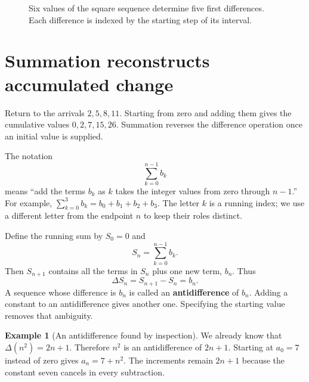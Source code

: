 \documentclass[11pt,oneside,openany]{book}
\theoremstyle{definition}
\newtheorem{example}{Example}[chapter]
\theoremstyle{remark}
\numberwithin{equation}{chapter}
\begin{document}
\begin{figure}[htbp]\centering
{}
\caption{Six values of the square sequence determine five first differences. Each difference is indexed by the starting step of its interval.}\end{figure}

\section{Summation reconstructs accumulated change}\label{ch01-summation-reconstructs-accumulated-change}

Return to the arrivals \(2,5,8,11\). Starting from zero and adding them gives the cumulative values \(0,2,7,15,26\). Summation reverses the difference operation once an initial value is supplied.

The notation \[\sum_{k=0}^{n-1}b_k\] means ``add the terms \(b_k\) as \(k\) takes the integer values from zero through \(n-1\).'' For example, \(\sum_{k=0}^3 b_k=b_0+b_1+b_2+b_3\). The letter \(k\) is a running index; we use a different letter from the endpoint \(n\) to keep their roles distinct.

Define the running sum by \(S_0=0\) and \[S_n=\sum_{k=0}^{n-1}b_k.\] Then \(S_{n+1}\) contains all the terms in \(S_n\) plus one new term, \(b_n\). Thus \[\Delta S_n=S_{n+1}-S_n=b_n.\] A sequence whose difference is \(b_n\) is called an \textbf{antidifference} of \(b_n\). Adding a constant to an antidifference gives another one. Specifying the starting value removes that ambiguity.

\begin{example}[An antidifference found by inspection]

We already know that \(\Delta(n^2)=2n+1\). Therefore \(n^2\) is an antidifference of \(2n+1\). Starting at \(a_0=7\) instead of zero gives \(a_n=7+n^2\). The increments remain \(2n+1\) because the constant seven cancels in every subtraction.

\end{example}
\end{document}
